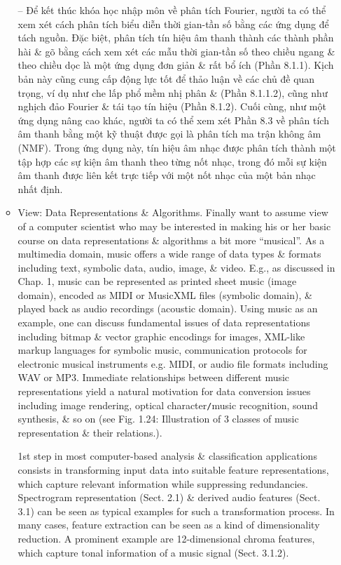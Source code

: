 \documentclass{article}
\begin{document}
\begin{itemize}
\begin{itemize}
		-- Để kết thúc khóa học nhập môn về phân tích Fourier, người ta có thể xem xét cách phân tích biểu diễn thời gian-tần số bằng các ứng dụng để tách nguồn. Đặc biệt, phân tích tín hiệu âm thanh thành các thành phần hài \& gõ bằng cách xem xét các mẫu thời gian-tần số theo chiều ngang \& theo chiều dọc là một ứng dụng đơn giản \& rất bổ ích (Phần 8.1.1). Kịch bản này cũng cung cấp động lực tốt để thảo luận về các chủ đề quan trọng, ví dụ như che lấp phổ mềm nhị phân \& (Phần 8.1.1.2), cũng như nghịch đảo Fourier \& tái tạo tín hiệu (Phần 8.1.2). Cuối cùng, như một ứng dụng nâng cao khác, người ta có thể xem xét Phần 8.3 về phân tích âm thanh bằng một kỹ thuật được gọi là phân tích ma trận không âm (NMF). Trong ứng dụng này, tín hiệu âm nhạc được phân tích thành một tập hợp các sự kiện âm thanh theo từng nốt nhạc, trong đó mỗi sự kiện âm thanh được liên kết trực tiếp với một nốt nhạc của một bản nhạc nhất định.
		\item {\sf View: Data Representations \& Algorithms.} Finally want to assume view of a computer scientist who may be interested in making his or her basic course on data representations \& algorithms a bit more ``musical''. As a multimedia domain, music offers a wide range of data types \& formats including text, symbolic data, audio, image, \& video. E.g., as discussed in Chap. 1, music can be represented as printed sheet music (image domain), encoded as MIDI or MusicXML files (symbolic domain), \& played back as audio recordings (acoustic domain). Using music as an example, one can discuss fundamental issues of data representations including bitmap \& vector graphic encodings for images, XML-like markup languages for symbolic music, communication protocols for electronic musical instruments e.g. MIDI, or audio file formats including WAV or MP3. Immediate relationships between different music representations yield a natural motivation for data conversion issues including image rendering, optical character{\tt/}music recognition, sound synthesis, \& so on (see {\sf Fig. 1.24: Illustration of 3 classes of music representation \& their relations.}).
		
		1st step in most computer-based analysis \& classification applications consists in transforming input data into suitable feature representations, which capture relevant information while suppressing redundancies. Spectrogram representation (Sect. 2.1) \& derived audio features (Sect. 3.1) can be seen as typical examples for such a transformation process. In many cases, feature extraction can be seen as a kind of dimensionality reduction. A prominent example are 12-dimensional chroma features, which capture tonal information of a music signal (Sect. 3.1.2).
		

\end{itemize}
\end{itemize}
\end{document}
